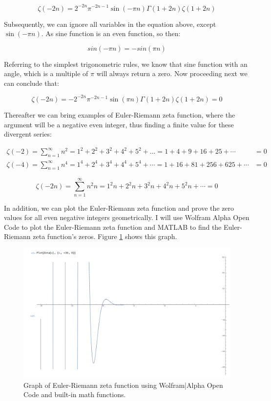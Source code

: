 \documentclass[11pt]{article}
\begin{document}
\begin{equation}
  \zeta(-2n)=2^{-2n}\pi^{-2n-1}\sin(-\pi n)\Gamma(1+2n)\zeta(1+2n)
  \end{equation}

Subsequently, we can ignore all variables in the equation above, except
\(\sin(-\pi n)\). As sine function is an even function, so then:

\begin{equation}
  sin(-\pi n)=-sin(\pi n)
  \end{equation}

Referring to the simplest trigonometric rules, we know that sine function with
an angle, which is a multiple of \(\pi\) will always return a zero. Now proceeding
next we can conclude that: 

\begin{equation*}
  \zeta(-2n)=-2^{-2n}\pi^{-2n-1}\sin(\pi n)\Gamma(1+2n)\zeta(1+2n)=0
  \end{equation*}

Thereafter we can bring examples of Euler-Riemann zeta function, where the
argument will be a negative even integer, thus finding a finite value for these
divergent series: 

\begin{align*}
  \zeta(-2)=\sum_{n=1}^{\infty} n^2=1^2+2^2+3^2+4^2+5^2+...=1+4+9+16+25+\cdots&=0\\
  \zeta(-4)=\sum_{n=1}^{\infty} n^4=1^4+2^4+3^4+4^4+5^4+\cdots=1+16+81+256+625+\cdots&=0
\end{align*}

\begin{equation}
\zeta(-2n)=\sum_{n=1}^{\infty} n^2n=1^2n+2^2n+3^2n+4^2n+5^2n+\cdots=0
  \end{equation}

In addition, we can plot the Euler-Riemann zeta function and prove the zero
values for all even negative integers geometrically. I will use Wolfram Alpha
Open Code to plot the Euler-Riemann zeta function and MATLAB to find the
Euler-Riemann zeta function's zeros. Figure \ref{fig:org07da5df} shows this graph. 

\begin{figure}[htbp]
\centering
\includegraphics[width=.9\linewidth]{./zeros.png}
\caption{\label{fig:org07da5df}
Graph of Euler-Riemann zeta function using Wolfram|Alpha Open Code and built-in math functions.}
\end{figure}
\end{document}

